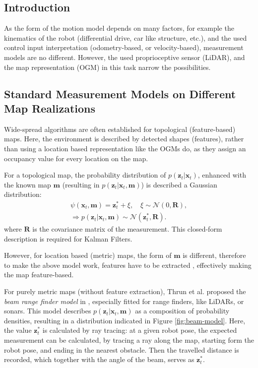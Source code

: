 \subsection{Introduction}
As the form of the motion model depends on many factors, for example the kinematics of the robot
(differential drive, car like structure, etc.), and the used control input interpretation
(odometry-based, or velocity-based), measurement models are no different.
However, the used proprioceptive sensor (LiDAR), and the map representation (OGM) in this task
narrow the possibilities.

\subsection{Standard Measurement Models on Different Map Realizations}
Wide-spread algorithms are often established for topological (feature-based) maps.
Here, the environment is described by detected shapes (features), rather than using a location based representation
like the OGMs do, as they assign an occupancy value for every location on the map.

For a topological map, the probability distribution of $p(\mathbf{\mathbf{z}}_t | \mathbf{x}_t)$,
enhanced with the known map $\mathbf{m}$ (resulting in $p(\mathbf{\mathbf{z}}_t | \mathbf{x}_t,\mathbf{m})$)
is described a Gaussian distribution:
\begin{align}
    \psi(\mathbf{x}_t,\mathbf{m}) = \mathbf{z}^*_t + \xi, \quad \xi \sim \mathcal{N}(0,\mathbf{R}), \\
    \Rightarrow p(\mathbf{\mathbf{z}}_t | \mathbf{x}_t,\mathbf{m}) \sim \mathcal{N}(\mathbf{z}_t^*,\mathbf{R}).
\end{align}
where $\mathbf{R}$ is the covariance matrix of the measurement.
This closed-form description is required for Kalman Filters.

However, for location based (metric) maps, the form of $\mathbf{m}$ is different, therefore
to make the above model work, features have to be extracted \cite{Durrant-Whyte1991},
effectively making the map feature-based.

For purely metric maps (without feature extraction), Thrun et al. proposed the \emph{beam range finder model}
in \cite{Thrun2005}, especially fitted for range finders, like LiDARs, or sonars.
This model describes  $p(\mathbf{\mathbf{z}}_t | \mathbf{x}_t,\mathbf{m})$ as a composition of
probability densities, resulting in a distribution indicated in Figure \ref{fig:beam-model}.
Here, the value $\mathbf{z}_t^*$ is calculated by ray tracing: at a given robot pose,
the expected measurement can be calculated, by tracing a ray along the map, starting form
the robot pose, and ending in the nearest obstacle. Then the travelled distance is recorded,
which together with the angle of the beam, serves as $\mathbf{z}_t^*$.

